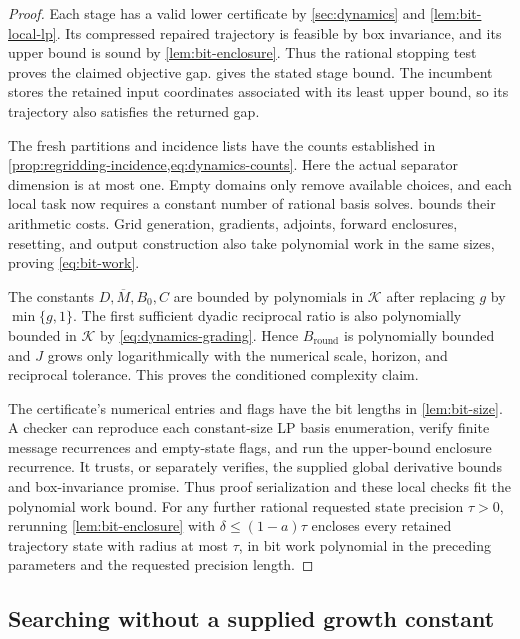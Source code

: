 \begin{proof}
Each stage has a valid lower certificate by \cref{sec:dynamics} and
\cref{lem:bit-local-lp}.  Its compressed repaired trajectory is feasible
by box invariance, and its upper bound is sound by
\cref{lem:bit-enclosure}.  Thus the rational stopping test proves the
claimed objective gap.   gives the stated stage bound.
The incumbent stores the retained input coordinates associated with its
least upper bound, so its trajectory also satisfies the returned gap.

The fresh partitions and incidence lists have the counts established in
\cref{prop:regridding-incidence,eq:dynamics-counts}.  Here the actual
separator dimension is at most one.  Empty domains only remove available choices,
and each local task now requires a constant number of rational basis solves.
 bounds their arithmetic costs.  Grid generation,
gradients, adjoints, forward enclosures, resetting, and output construction
also take polynomial work in the same sizes, proving \cref{eq:bit-work}.

The constants $D,\overline M,B_0,C$ are bounded by polynomials in
$\mathcal K$ after replacing $g$ by $\min\{g,1\}$.  The first sufficient
dyadic reciprocal ratio is also polynomially bounded in $\mathcal K$ by
\cref{eq:dynamics-grading}.  Hence $B_{\mathrm{round}}$ is polynomially
bounded and $J$ grows only logarithmically with the numerical scale, horizon,
and reciprocal tolerance.  This proves the conditioned complexity claim.

The certificate's numerical entries and flags have the bit lengths in
\cref{lem:bit-size}.  A checker can reproduce each constant-size LP basis
enumeration, verify finite message recurrences and empty-state flags, and
run the upper-bound enclosure recurrence.  It trusts, or separately
verifies, the supplied global derivative bounds and box-invariance promise.
Thus proof serialization and these local checks fit the polynomial work
bound. For any further rational requested state precision $\tau>0$, rerunning
\cref{lem:bit-enclosure} with $\delta\le(1-a)\tau$ encloses every
retained trajectory state with radius at most $\tau$, in bit work
polynomial in the preceding parameters and the requested precision length.
\end{proof}

\subsection{Searching without a supplied growth constant}

